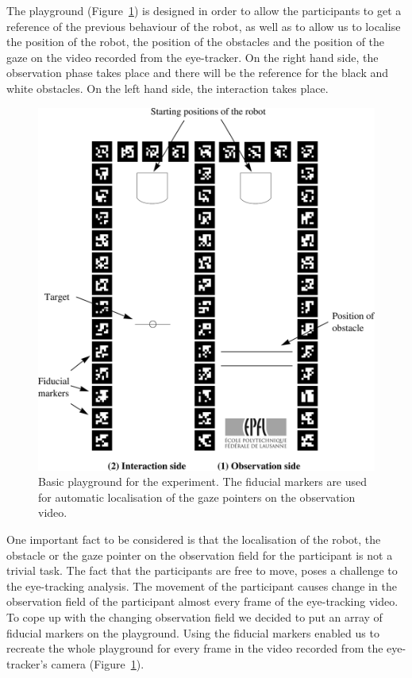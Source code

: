 \documentclass{sig-alternate}
\begin{document}
The playground (Figure~\ref{playground}) is designed in order to allow the
participants to get a reference of the previous behaviour of the robot, as well
as to allow us to localise the position of the robot, the position of the
obstacles and the position of the gaze on the video recorded from the
eye-tracker.  On the right hand side, the observation phase takes
place and there will be the reference for the black and white obstacles. On the
left hand side, the interaction takes place.

\begin{figure}
    \centering
    \includegraphics[width=0.9\linewidth]{maze}
    \caption{\small Basic playground for the experiment. The fiducial markers
    are used for automatic localisation of the gaze pointers on the observation
    video.}

    \label{playground}
\end{figure}

One important fact to be considered is that the localisation of the
robot, the obstacle or the gaze pointer on the observation field for the
participant is not a trivial task. The fact that the participants are
free to move, poses a challenge to the eye-tracking analysis. The
movement of the participant causes change in the observation field of
the participant almost every frame of the eye-tracking video. To cope up
with the changing observation field we decided to put an array of
fiducial markers on the playground. Using the fiducial markers enabled
us to recreate the whole playground for every frame in the video
recorded from the eye-tracker's camera (Figure~\ref{playground}).
\end{document}
